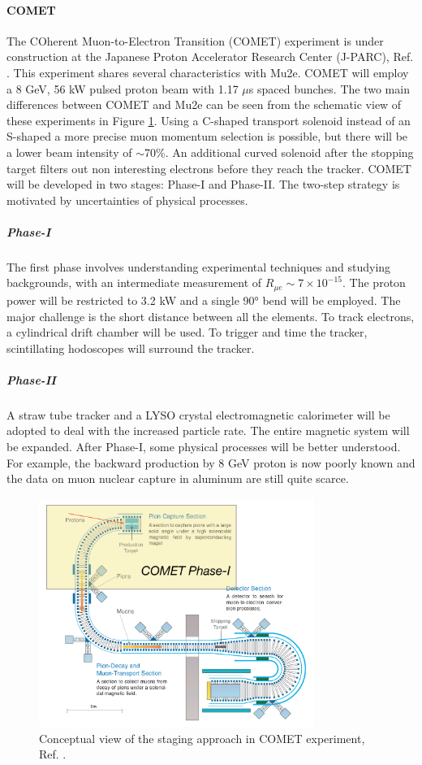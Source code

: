 \paragraph{COMET}
The COherent Muon-to-Electron Transition (COMET) experiment is under construction at
the Japanese Proton Accelerator Research Center (J-PARC), Ref. \cite{Abramishvili_2020}. 
This experiment shares several characteristics with Mu2e. COMET will employ a 8 GeV, 56 kW pulsed proton beam
with 1.17 $\mu$s spaced bunches. The two main differences between
COMET and Mu2e can be seen from the schematic view of these experiments in Figure \ref{fig:comet}.
Using a C-shaped transport solenoid instead of an S-shaped a more precise muon momentum selection 
is possible, but there will be a lower beam intensity of $\sim$70\%.
An additional curved solenoid after the stopping target filters out non 
interesting electrons before they reach the tracker.
COMET will be developed in two stages: Phase-I and Phase-II. The two-step strategy is motivated by uncertainties of physical processes. 
\subparagraph*{Phase-I} The first phase involves understanding experimental techniques and studying backgrounds, 
with an intermediate measurement of $R_{\mu e} \sim 7\times 10^{-15}$. The proton power will be restricted to 
3.2 kW and a single 90° bend will be employed. The major challenge is the short distance between all the elements. 
To track electrons, a cylindrical drift chamber will be used. To trigger and time the tracker, 
scintillating hodoscopes will surround the tracker. 
\subparagraph*{Phase-II} A straw tube tracker and a LYSO crystal electromagnetic 
calorimeter will be adopted to deal with the increased particle rate. 
The entire magnetic system will be  expanded.
After Phase-I, some physical processes will be better understood.
For example, the backward production by 8 GeV proton is now poorly known and the data on muon nuclear
capture in aluminum are still quite scarce. 
\begin{figure}[!h]
\centering
\includegraphics[width =0.8\textwidth]{figures/png/Screenshot_20240307_152133.png}
\caption{Conceptual view of the staging approach in COMET experiment, Ref. \cite{Abramishvili_2020}.}
\label{fig:comet}
\end{figure}

